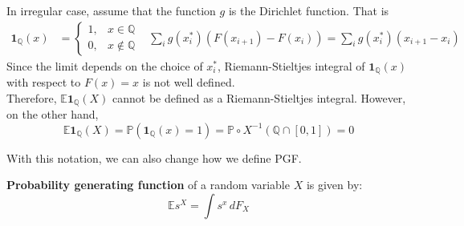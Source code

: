 \documentclass{huhtakm-template-book}
\newcommand{\prob}{\mathbb{P}}
\newcommand{\expect}{\mathbb{E}}
\begin{document}
    \begin{eg}
        In irregular case, assume that the function $g$ is the Dirichlet function. That is
        \begin{align*}
            \mathbf{1}_{\mathbb{Q}}(x)&=\begin{cases}
                1, &x\in\mathbb{Q}\\
                0, &x\not\in\mathbb{Q}
            \end{cases} & \sum_{i}g(x_{i}^{*})(F(x_{i+1})-F(x_{i}))=\sum_{i}g(x_{i}^{*})(x_{i+1}-x_{i})
        \end{align*}
        Since the limit depends on the choice of $x_{i}^{*}$, Riemann-Stieltjes integral of $\mathbf{1}_{\mathbb{Q}}(x)$ with respect to $F(x)=x$ is not well defined.\\
        Therefore, $\expect\mathbf{1}_{\mathbb{Q}}(X)$ cannot be defined as a Riemann-Stieltjes integral. However, on the other hand,
        \begin{equation*}
            \expect\mathbf{1}_{\mathbb{Q}}(X)=\prob(\mathbf{1}_{\mathbb{Q}}(x)=1)=\prob\circ X^{-1}(\mathbb{Q}\cap[0,1])=0
        \end{equation*}
    \end{eg}
    With this notation, we can also change how we define PGF.
    \begin{defn}
        \textbf{Probability generating function} of a random variable $X$ is given by:
        \begin{equation*}
            \expect s^{X}=\int s^{x}\,dF_{X}
        \end{equation*}
    \end{defn}
    
\end{document}

